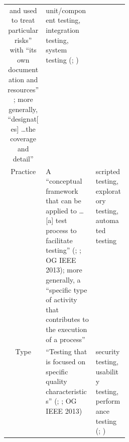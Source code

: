 \begin{table}[hbtp!]
\begin{tabularx}{\linewidth}{|c|X|m{0.275\linewidth}|}
        and used to treat particular risks'' \citep[p.~12]{IEEE2022} with
        ``its own documentation and resources'' \citep[p.~469]{IEEE2017}; more
        generally, ``designat[es] \dots the coverage and detail''
        \citep[p.~249]{IEEE2017}          & unit/component testing,
        integration testing, system testing (\citealp[p.~12]{IEEE2022};
        \citealp[p.~467]{IEEE2017})                                                                    \\
        Practice                          & A ``conceptual framework
        that can be applied to \dots [a] test process to facilitate testing''
        (\citealp[p.~14]{IEEE2022}; \citealp[p.~471]{IEEE2017}; OG IEEE 2013);
        more generally, a ``specific type of activity
        that contributes to the execution of a process''
        \citep[p.~331]{IEEE2017}          & scripted testing,
        exploratory testing, automated testing \citep[p.~20]{IEEE2022}                                 \\
        Type                              & ``Testing that is focused
        on specific quality characteristics''
        (\citealp[p.~15]{IEEE2022}; \citealp[p.~473]{IEEE2017};
        OG IEEE 2013)                     & security testing, usability testing,
        performance testing (\citealp[p.~15]{IEEE2022};
        \citealp[p.~473]{IEEE2017})                                                                    \\
        \hline
    \end{tabularx}
\end{table}
